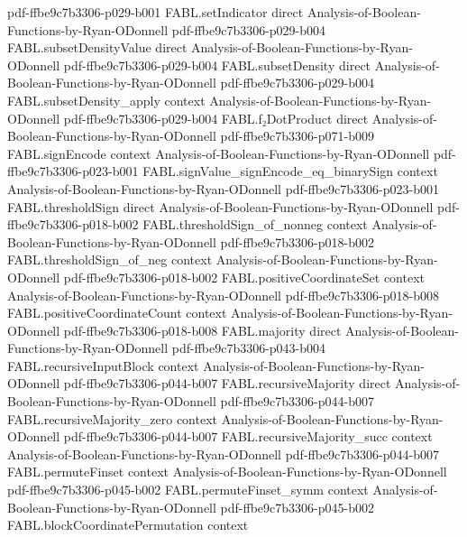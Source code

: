\begin{theorem}
  {pdf-ffbe9c7b3306-p029-b001}
\proofstep
  {FABL.setIndicator}
  {direct}
  {Analysis-of-Boolean-Functions-by-Ryan-ODonnell}
  {pdf-ffbe9c7b3306-p029-b004}
\proofstep
  {FABL.subsetDensityValue}
  {direct}
  {Analysis-of-Boolean-Functions-by-Ryan-ODonnell}
  {pdf-ffbe9c7b3306-p029-b004}
\proofstep
  {FABL.subsetDensity}
  {direct}
  {Analysis-of-Boolean-Functions-by-Ryan-ODonnell}
  {pdf-ffbe9c7b3306-p029-b004}
\proofstep
  {FABL.subsetDensity_apply}
  {context}
  {Analysis-of-Boolean-Functions-by-Ryan-ODonnell}
  {pdf-ffbe9c7b3306-p029-b004}
\proofstep
  {FABL.f₂DotProduct}
  {direct}
  {Analysis-of-Boolean-Functions-by-Ryan-ODonnell}
  {pdf-ffbe9c7b3306-p071-b009}
\proofstep
  {FABL.signEncode}
  {context}
  {Analysis-of-Boolean-Functions-by-Ryan-ODonnell}
  {pdf-ffbe9c7b3306-p023-b001}
\proofstep
  {FABL.signValue_signEncode_eq_binarySign}
  {context}
  {Analysis-of-Boolean-Functions-by-Ryan-ODonnell}
  {pdf-ffbe9c7b3306-p023-b001}
\proofstep
  {FABL.thresholdSign}
  {direct}
  {Analysis-of-Boolean-Functions-by-Ryan-ODonnell}
  {pdf-ffbe9c7b3306-p018-b002}
\proofstep
  {FABL.thresholdSign_of_nonneg}
  {context}
  {Analysis-of-Boolean-Functions-by-Ryan-ODonnell}
  {pdf-ffbe9c7b3306-p018-b002}
\proofstep
  {FABL.thresholdSign_of_neg}
  {context}
  {Analysis-of-Boolean-Functions-by-Ryan-ODonnell}
  {pdf-ffbe9c7b3306-p018-b002}
\proofstep
  {FABL.positiveCoordinateSet}
  {context}
  {Analysis-of-Boolean-Functions-by-Ryan-ODonnell}
  {pdf-ffbe9c7b3306-p018-b008}
\proofstep
  {FABL.positiveCoordinateCount}
  {context}
  {Analysis-of-Boolean-Functions-by-Ryan-ODonnell}
  {pdf-ffbe9c7b3306-p018-b008}
\proofstep
  {FABL.majority}
  {direct}
  {Analysis-of-Boolean-Functions-by-Ryan-ODonnell}
  {pdf-ffbe9c7b3306-p043-b004}
\proofstep
  {FABL.recursiveInputBlock}
  {context}
  {Analysis-of-Boolean-Functions-by-Ryan-ODonnell}
  {pdf-ffbe9c7b3306-p044-b007}
\proofstep
  {FABL.recursiveMajority}
  {direct}
  {Analysis-of-Boolean-Functions-by-Ryan-ODonnell}
  {pdf-ffbe9c7b3306-p044-b007}
\proofstep
  {FABL.recursiveMajority_zero}
  {context}
  {Analysis-of-Boolean-Functions-by-Ryan-ODonnell}
  {pdf-ffbe9c7b3306-p044-b007}
\proofstep
  {FABL.recursiveMajority_succ}
  {context}
  {Analysis-of-Boolean-Functions-by-Ryan-ODonnell}
  {pdf-ffbe9c7b3306-p044-b007}
\proofstep
  {FABL.permuteFinset}
  {context}
  {Analysis-of-Boolean-Functions-by-Ryan-ODonnell}
  {pdf-ffbe9c7b3306-p045-b002}
\proofstep
  {FABL.permuteFinset_symm}
  {context}
  {Analysis-of-Boolean-Functions-by-Ryan-ODonnell}
  {pdf-ffbe9c7b3306-p045-b002}
\proofstep
  {FABL.blockCoordinatePermutation}
  {context}

\end{theorem}
